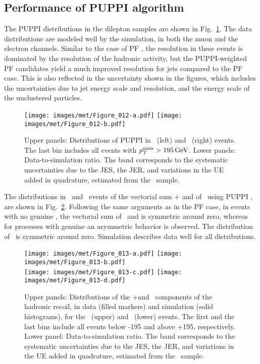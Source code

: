 \subsection*{Performance of PUPPI \ptmiss algorithm}
\noindent
\justify
The PUPPI \ptmiss distributions in the dilepton samples are shown in Fig.~\ref{fig:puppimet}. 
The data distributions are modeled well by the simulation, in both the muon and the electron channels. 
Similar to the case of PF \ptmiss, the \ptmiss resolution in these events is dominated by the resolution of the hadronic activity, 
but the PUPPI-weighted PF candidates yield a much improved resolution for jets compared to the PF case. 
This is also reflected in the uncertainty shown in the figures, which includes the uncertainties due to jet energy scale and resolution, and the energy scale of the unclustered particles. 
\begin{figure}[!htp]
  \centering
  \texttt{[image: images/met/Figure\_012-a.pdf]}
  \texttt{[image: images/met/Figure\_012-b.pdf]}
  \caption{Upper panels: Distributions of PUPPI \ptmiss in \Zmm\ (left) and \Zee\ (right) events. The last bin includes all events with $p_{\mathrm{T}}^\text{miss}>195\,\text{Ge\hspace{-.08em}V}$.
Lower panels: Data-to-simulation ratio. The band corresponds to the systematic uncertainties due to the JES, the JER, and variations in the UE added in quadrature, estimated from the \Zee\ sample.}
  \label{fig:puppimet}
\end{figure}
The distributions in \Zmm\ and \Zee\ events of the vectorial sum \upar + \qt and of \uperp\, using PUPPI \ptmiss,  are shown in Fig.~\ref{fig:uparuperp_puppi}. 
Following the same arguments as in the PF \ptmiss case, in events with no genuine \ptmiss, the vectorial sum of \upar\ and \qt is symmetric around zero, whereas for processes with genuine \ptmiss an asymmetric behavior is observed. 
The distribution of \uperp\ is symmetric around zero. Simulation describes data well for all distributions.
\begin{figure}[!htp]
  \centering
  \texttt{[image: images/met/Figure\_013-a.pdf]}
  \texttt{[image: images/met/Figure\_013-b.pdf]}\\
  \texttt{[image: images/met/Figure\_013-c.pdf]}
  \texttt{[image: images/met/Figure\_013-d.pdf]}
  \caption{Upper panels: Distributions of the \upar+\qt and \uperp\ components of the hadronic recoil, in data (filled markers) and simulation (solid histograms), for the \Zmm\ (upper) and \Zee\ (lower) events. The first and the last bins include all events below -195 and above +195, respectively.
Lower panel: Data-to-simulation ratio. The band corresponds to the systematic uncertainties due to the JES, the JER, and variations in the UE added in quadrature, estimated from the \Zee\ sample.}
  \label{fig:uparuperp_puppi}
\end{figure}
